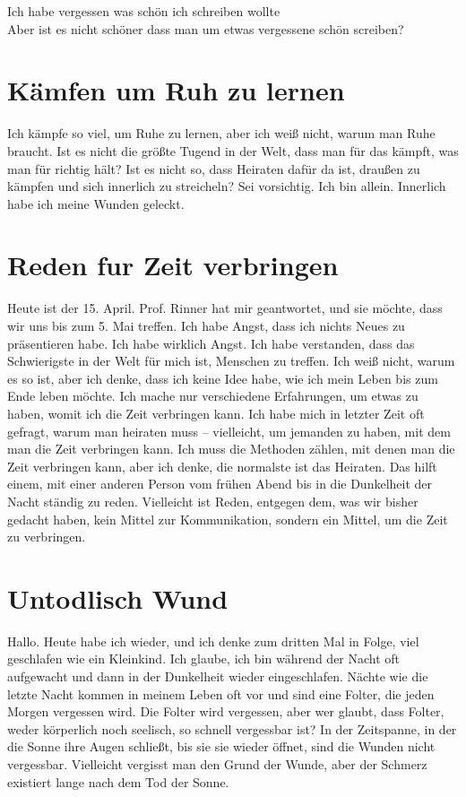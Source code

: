 \documentclass[a4paper]{article}
\title{}
\date{}
\begin{document}
    \maketitle
    Ich habe vergessen was schön ich schreiben wollte\\
    Aber ist es nicht schöner dass man um etwas vergessene schön screiben?
    
    
    \section{Kämfen um Ruh zu lernen}
        Ich kämpfe so viel, um Ruhe zu lernen, aber ich weiß nicht, warum man Ruhe braucht. Ist es nicht die größte Tugend in der Welt, dass man für das kämpft, was man für richtig hält? Ist es nicht so, dass Heiraten dafür da ist, draußen zu kämpfen und sich innerlich zu streicheln? Sei vorsichtig. Ich bin allein. Innerlich habe ich meine Wunden geleckt.
    
    
    \section{Reden fur Zeit verbringen}
        Heute ist der 15. April. Prof. Rinner hat mir geantwortet, und sie möchte, dass wir uns bis zum 5. Mai treffen. Ich habe Angst, dass ich nichts Neues zu präsentieren habe. Ich habe wirklich Angst. Ich habe verstanden, dass das Schwierigste in der Welt für mich ist, Menschen zu treffen. Ich weiß nicht, warum es so ist, aber ich denke, dass ich keine Idee habe, wie ich mein Leben bis zum Ende leben möchte. Ich mache nur verschiedene Erfahrungen, um etwas zu haben, womit ich die Zeit verbringen kann. Ich habe mich in letzter Zeit oft gefragt, warum man heiraten muss – vielleicht, um jemanden zu haben, mit dem man die Zeit verbringen kann. Ich muss die Methoden zählen, mit denen man die Zeit verbringen kann, aber ich denke, die normalste ist das Heiraten. Das hilft einem, mit einer anderen Person vom frühen Abend bis in die Dunkelheit der Nacht ständig zu reden. Vielleicht ist Reden, entgegen dem, was wir bisher gedacht haben, kein Mittel zur Kommunikation, sondern ein Mittel, um die Zeit zu verbringen.
    
    
    \section{Untodlisch Wund}
        Hallo. Heute habe ich wieder, und ich denke zum dritten Mal in Folge, viel geschlafen wie ein Kleinkind. Ich glaube, ich bin während der Nacht oft aufgewacht und dann in der Dunkelheit wieder eingeschlafen. Nächte wie die letzte Nacht kommen in meinem Leben oft vor und sind eine Folter, die jeden Morgen vergessen wird. Die Folter wird vergessen, aber wer glaubt, dass Folter, weder körperlich noch seelisch, so schnell vergessbar ist? In der Zeitspanne, in der die Sonne ihre Augen schließt, bis sie sie wieder öffnet, sind die Wunden nicht vergessbar. Vielleicht vergisst man den Grund der Wunde, aber der Schmerz existiert lange nach dem Tod der Sonne.
    
\end{document}
